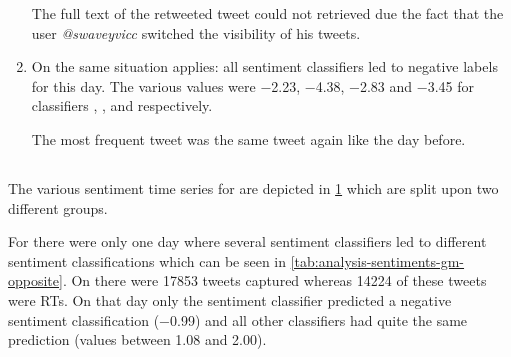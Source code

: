 \begin{enumerate}
        The full text of the retweeted tweet could not retrieved due the fact that the user \emph{@swaveyvicc} switched the visibility of his tweets.

    \item 
        On  the same situation applies: all sentiment classifiers led to negative labels for this day.
        The various values were \num{-2.23}, \num{-4.38}, \num{-2.83} and \num{-3.45} for classifiers \ftb{}, \fnb{}, \fme{} and \fsvm{} respectively.


        The most frequent tweet was the same tweet again like the day before.
\end{enumerate}


\subsection{\gm}
\label{ss:analysis-sentiments-gm}

The various sentiment time series for \gm{} are depicted in \cref{fig:analysis-sentiments-gm} which are split upon two different groups.

\begin{figure}[hbt]
    \centering
    
    \caption{\sentimentsCaption{\gm}}
    \label{fig:analysis-sentiments-gm}
\end{figure}


For \gm{} there were only one day where several sentiment classifiers led to different sentiment classifications which can be seen in \cref{tab:analysis-sentiments-gm-opposite}.
On  there were \num{17853} tweets captured whereas \num{14224} of these tweets were \acp{RT}.
On that day only the \nb{} sentiment classifier predicted a negative sentiment classification (\num{-0.99}) and all other classifiers had quite the same prediction (values between \num{1.08} and \num{2.00}).

